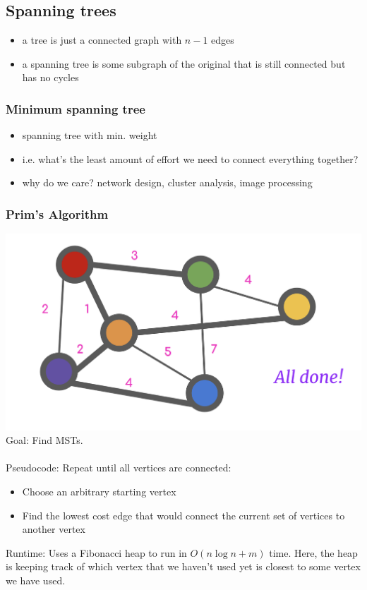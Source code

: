 \documentclass[12pt]{article}
\begin{document}
\subsection*{Spanning trees}
\begin{itemize}
    \item a tree is just a connected graph with $n-1$ edges
    \item a spanning tree is some subgraph of the original that is still connected but has no cycles
\end{itemize}
\subsubsection*{Minimum spanning tree}
\begin{itemize}
    \item spanning tree with min. weight 
    \item i.e. what's the least amount of effort we need to connect everything together?
    \item why do we care? network design, cluster analysis, image processing
\end{itemize}

\subsubsection*{Prim's Algorithm}
\includegraphics[scale=0.3]{prim.png} \\ 
Goal: Find MSTs. 
\\\\
Pseudocode: Repeat until all vertices are connected:
\begin{itemize}
    \item Choose an arbitrary starting vertex
    \item Find the lowest cost edge that would connect the current set of vertices to another vertex
\end{itemize}
Runtime: Uses a Fibonacci heap to run in $O(n \log n + m)$
time. Here, the heap is keeping track of which
vertex that we haven't used yet is closest
to some vertex we have used.
\end{document}
